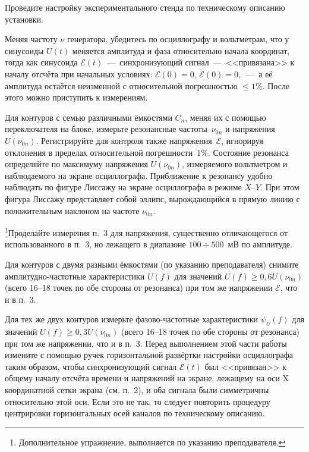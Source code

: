 \begin{lab:task}
    \item Проведите настройку экспериментального стенда по техническому описанию
установки.

    \item Меняя частоту $\nu$ генератора, убедитесь по осциллографу и вольтметрам,
что у синусоиды $U(t)$ меняется амплитуда и фаза относительно начала координат,
тогда как синусоида $\mathcal{E}(t)$~---~синхронизующий сигнал~---~<<привязана>>
к началу отсчёта при начальных условиях: $\mathcal{E}(0)=0$,
$\dot{\mathcal{E}}(0)=0,$~---~а её амплитуда остаётся неизменной с относительной
погрешностью  $\le1\%$. После этого можно приступить к измерениям.

    \item Для контуров с семью различными ёмкостями $C_n$, меняя их с помощью
переключателя на блоке, измерьте резонансные частоты~$\nu_{0n}$ и напряжения
$U(\nu_{0n})$. Регистрируйте для контроля также напряжения~$\mathcal{E}$,
игнорируя отклонения в пределах относительной погрешности~$1\%$. Состояние
резонанса определяйте по максимуму напряжения $U(\nu_{0n})$, измеряемого
вольтметром и наблюдаемого на экране осциллографа. Приближение к резонансу
удобно наблюдать по фигуре Лиссажу на экране осциллографа в режиме $X$--$Y$.
При этом фигура Лиссажу представляет собой эллипс, вырождающийся в прямую линию
с положительным наклоном  на частоте $\nu_{0n}$.

    \item \footnote{Дополнительное упражнение, выполняется по указанию
        преподавателя.}Проделайте измерения п.~3 для напряжения, существенно 
    отличающегося от использованного в п.~3, но лежащего в диапазоне $100\div500$~мВ 
    по амплитуде.

    \item Для контуров с двумя разными ёмкостями (по указанию преподавателя)
снимите амплитудно-частотные характеристики $U(f)$ для значений
$U(f)\ge0,6U(\nu_{0n})$ (всего 16--18 точек по обе стороны от резонанса) при
том же напряжении $\mathcal{E}$, что и в п.~3.

    \item Для тех же двух контуров измерьте фазово-частотные характеристики
$\psi_U(f)$ для значений $U(f)\ge0,3U(\nu_{0n})$ (всего 16--18 точек по обе
стороны от резонанса) при том же напряжении, что и в п.~3. Перед выполнением
этой части работы измените с помощью ручек горизонтальной развёртки настройки
осциллографа таким образом, чтобы синхронизующий сигнал $\mathcal{E}(t)$ был
<<привязан>> к общему началу отсчёта времени и напряжений на экране, лежащему на
оси X координатной сетки экрана (см. п.~2), и оба сигнала были симметричны
относительно этой оси. Если это не так, то следует повторить процедуру
центрировки горизонтальных осей каналов по техническому описанию.


\end{lab:task}
